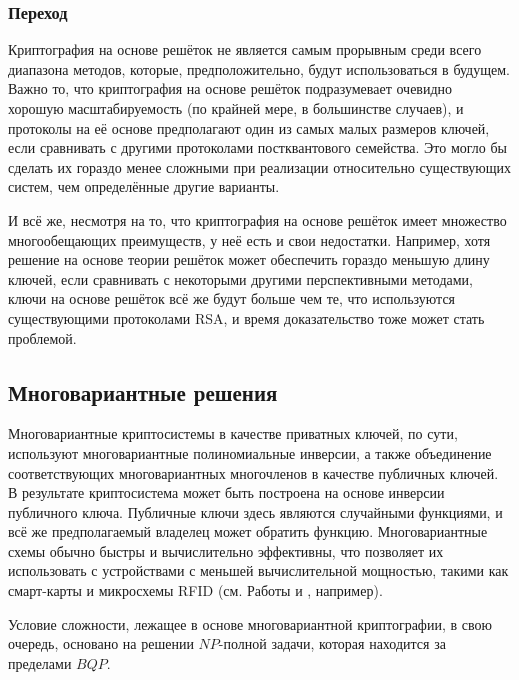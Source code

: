 \documentclass{mrl}
\begin{document}
\subsubsection{Переход}

Криптография на основе решёток не является самым прорывным среди всего диапазона методов, которые, предположительно, будут использоваться в будущем. Важно то, что криптография на основе решёток подразумевает очевидно хорошую масштабируемость (по крайней мере, в большинстве случаев), и протоколы на её основе предполагают один из самых малых размеров ключей, если сравнивать с другими протоколами постквантового семейства. Это могло бы сделать их гораздо менее сложными при реализации относительно существующих систем, чем определённые другие варианты.

И всё же, несмотря на то, что криптография на основе решёток имеет множество многообещающих преимуществ, у неё есть и свои недостатки. Например, хотя решение на основе теории решёток может обеспечить гораздо меньшую длину ключей, если сравнивать с некоторыми другими перспективными методами, ключи на основе решёток всё же будут больше чем те, что используются существующими протоколами RSA, и время доказательство тоже может стать проблемой.

\subsection{Многовариантные решения}

Многовариантные криптосистемы в качестве приватных ключей, по сути, используют многовариантные полиномиальные инверсии, а также объединение соответствующих многовариантных многочленов в качестве публичных ключей. В результате криптосистема может быть построена на основе инверсии публичного ключа. Публичные ключи здесь являются случайными функциями, и всё же предполагаемый владелец может обратить функцию. Многовариантные схемы обычно быстры и вычислительно эффективны, что позволяет их использовать с устройствами с меньшей вычислительной мощностью, такими как смарт-карты и микросхемы RFID (см. Работы \cite{bogdanov2008time} и \cite{chen2009sse}, например).

Условие сложности, лежащее в основе многовариантной криптографии, в свою очередь, основано на решении $NP$-полной задачи, которая находится за пределами $BQP$.
\end{document}
